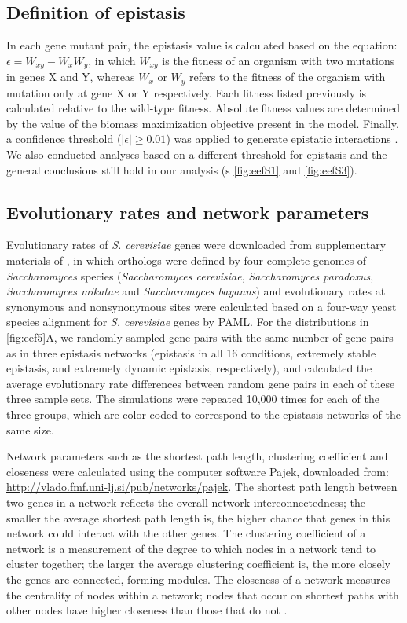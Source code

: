 \subsection{Definition of epistasis}

In each gene mutant pair, the epistasis value is calculated based on
the equation: $\epsilon = W_{xy} - W_xW_y$, in which $W_{xy}$ is the
fitness of an organism with two mutations in genes X and Y, whereas
$W_{x}$ or $W_{y}$ refers to the fitness of the organism with mutation
only at gene X or Y respectively. Each fitness listed previously is
calculated relative to the wild-type fitness. Absolute fitness values
are determined by the value of the biomass maximization objective
present in the model. Finally, a confidence threshold
($\left|\epsilon\right| \geq 0.01$) was applied to generate epistatic
interactions \citep{Xu2012, Costanzo2010, He2010}. We also conducted
analyses based on a different threshold for epistasis and the general
conclusions still hold in our analysis (\Fig s \ref{fig:eefS1} and
\ref{fig:eefS3}).

\subsection{Evolutionary rates and network parameters}

Evolutionary rates of \textit{S. cerevisiae} genes were downloaded
from supplementary materials of \citet{Wall2005}, in which orthologs were
defined by four complete genomes of \textit{Saccharomyces} species
(\textit{Saccharomyces cerevisiae}, \textit{Saccharomyces paradoxus},
\textit{Saccharomyces mikatae} and \textit{Saccharomyces bayanus}) and
evolutionary rates at synonymous and nonsynonymous sites were
calculated based on a four-way yeast species alignment for
\textit{S. cerevisiae} genes by PAML. For the distributions in
\ref{fig:eef5}A, we randomly sampled gene pairs with the same number
of gene pairs
as in three epistasis networks (epistasis in all 16 conditions,
extremely stable epistasis, and extremely dynamic epistasis,
respectively), and calculated the average evolutionary rate
differences between random gene pairs in each of these three sample
sets. The simulations were repeated 10,000 times for each of the three
groups, which are color coded to correspond to the epistasis networks
of the same size.

Network parameters such as the shortest path length, clustering
coefficient and closeness were calculated using the computer software
Pajek, downloaded from:
\url{http://vlado.fmf.uni-lj.si/pub/networks/pajek}. The shortest path
length between two genes in a network reflects the overall network
interconnectedness; the smaller the average shortest path length is,
the higher chance that genes in this network could interact with the
other genes. The clustering coefficient of a network is a measurement
of the degree to which nodes in a network tend to cluster together;
the larger the average clustering coefficient is, the more closely the
genes are connected, forming modules. The closeness of a network
measures the centrality of nodes within a network; nodes that occur on
shortest paths with other nodes have higher closeness than those that
do not \citep{Barabasi2004}.

